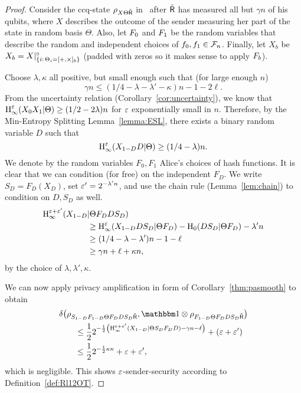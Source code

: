 \begin{proof}
  Consider the ccq-state $\rho_{X \Theta \tilde{\sf R}}$ in \eprRandlqot\ after
  $\tilde{\sf R}$ has measured all but $\gamma n$ of his qubits, where $X$
  describes the outcome of the sender measuring her part of the state
  in random basis $\Theta$. Also, let $F_0$ and $F_1$ be the
  random variables that describe the random and independent choices of
  $f_0,f_1 \in \mathcal{F}_{n}$.  Finally, let $X_b$ be $X_b =
  X|^{\circ}_{\{i:\,\Theta_i = [+,\times]_b\}}$ (padded with zeros so it
  makes sense to apply $F_b$).
  
  Choose $\lambda, \kappa$ all positive, but small enough
  such that (for large enough $n$) $$\gamma n \leq (1/4 - \lambda - \lambda' - \kappa) n -
  1 -2\ell .$$ From the uncertainty relation
  (Corollary~\ref{cor:uncertainty}), we know that
  $\operatorname{H}_{\infty}^{\varepsilon}(X_0 X_1 | \Theta) \geq (1/2 - 2\lambda )n$ for $\varepsilon$ exponentially small in $n$.
  Therefore, by the Min-Entropy Splitting Lemma~\ref{lemma:ESL}, there
  exists a binary random variable $D$ such that
\[\operatorname{H}_{\infty}^{\varepsilon}(X_{1-D} D | \Theta) \geq (1/4 - \lambda)n 
.\] We denote by the
random variables $F_0,F_1$ Alice's choices of hash functions. It is
clear that we can condition (for free) on the independent $F_{D}$. We
write $S_{D} = F_{D}(X_{D})$, set $\varepsilon'=2^{-\lambda' n}$, and use the
chain rule (Lemma~\ref{lem:chain}) to condition on $D,S_D$ as well.
\begin{align*}
  \operatorname{H}_{\infty}^{\varepsilon+\varepsilon'}(X_{1-D} &| \Theta F_D D S_{D})\\
  & \geq \operatorname{H}_{\infty}^{\varepsilon}(X_{1-D} D S_{D} | \Theta F_{D} ) -
  \operatorname{H}_{0}(D S_{D} | \Theta F_{D} ) - \lambda'n \\
&\geq (1/4 -\lambda - \lambda')n - 1 -\ell \\
&\geq \gamma n +\ell +\kappa n,
\end{align*}
by the choice of $\lambda, \lambda', \kappa$.

\hspace{5mm}
We can now apply privacy amplification
 in form of Corollary~\ref{thm:pasmooth}
to obtain
\begin{align*}
\dist{ &\rho_{S_{1-D} F_{1-D}  \Theta F_{D} D S_D \dR}, 
\id \otimes \rho_{F_{1-D}  \Theta F_{D}  D S_D \dR} } \\
&\quad \leq \frac12 2^{-\frac12 \left( \hie{\eps+\eps'}{ X_{1-D} |
 \Theta S_{D} F_{D}D} - \gamma n - \ell \right)} + (\eps+\eps')\\
&\quad \leq \frac12 2^{-\frac12 \kappa n} + \eps + \eps',
\end{align*} 
which is negligible. This shows $\varepsilon$-sender-security according to
Definition~\ref{def:Rl12OT}.
\end{proof}

